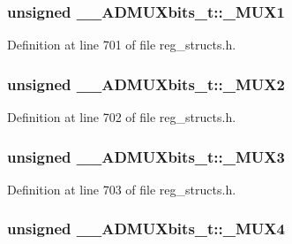 \hypertarget{union_____a_d_m_u_xbits__t_adad9ba63c570c7c4fd9fb3f76b29a089}{
\subsubsection[{\+\_\+\+M\+U\+X1}]{\setlength{\rightskip}{0pt plus 5cm}unsigned \+\_\+\+\_\+\+A\+D\+M\+U\+Xbits\+\_\+t\+::\+\_\+\+M\+U\+X1}}\label{union_____a_d_m_u_xbits__t_adad9ba63c570c7c4fd9fb3f76b29a089}


Definition at line 701 of file reg\+\_\+structs.\+h.

\hypertarget{union_____a_d_m_u_xbits__t_a4ea06c988aeef1bac45de09106cfc509}{
\subsubsection[{\+\_\+\+M\+U\+X2}]{\setlength{\rightskip}{0pt plus 5cm}unsigned \+\_\+\+\_\+\+A\+D\+M\+U\+Xbits\+\_\+t\+::\+\_\+\+M\+U\+X2}}\label{union_____a_d_m_u_xbits__t_a4ea06c988aeef1bac45de09106cfc509}


Definition at line 702 of file reg\+\_\+structs.\+h.

\hypertarget{union_____a_d_m_u_xbits__t_ab27ebfff043ae8dd982dd7527089a43d}{
\subsubsection[{\+\_\+\+M\+U\+X3}]{\setlength{\rightskip}{0pt plus 5cm}unsigned \+\_\+\+\_\+\+A\+D\+M\+U\+Xbits\+\_\+t\+::\+\_\+\+M\+U\+X3}}\label{union_____a_d_m_u_xbits__t_ab27ebfff043ae8dd982dd7527089a43d}


Definition at line 703 of file reg\+\_\+structs.\+h.

\hypertarget{union_____a_d_m_u_xbits__t_a9d35776a58434d59d4ede7459128875a}{
\subsubsection[{\+\_\+\+M\+U\+X4}]{\setlength{\rightskip}{0pt plus 5cm}unsigned \+\_\+\+\_\+\+A\+D\+M\+U\+Xbits\+\_\+t\+::\+\_\+\+M\+U\+X4}}\label{union_____a_d_m_u_xbits__t_a9d35776a58434d59d4ede7459128875a}


